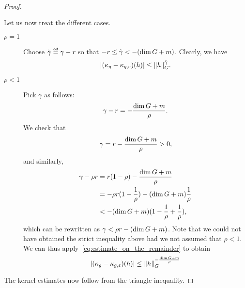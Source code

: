 \begin{proof}
\begin{description}
            Let us now treat the different cases.
            \begin{description}
                \item[$\rho = 1$]
                    Choose $\tilde \gamma \defeq \gamma - r$
                    so that $-r \leq \tilde \gamma < -(\dim \Group + m)$.
                    Clearly, we have
                    \begin{align*}
                        \abs{(\kappa_g - \kappa_{g, \epsilon})(h)}
                        \leq \norm [\Group] h^{\tilde \gamma}.
                    \end{align*}
                \item[$\rho < 1$]
                    Pick $\gamma$ as follows:
                    \begin{align*}
                        \gamma - r = -\frac{\dim \Group + m} \rho.
                    \end{align*}
                    We check that
                    \begin{align*}
                        \gamma = r - \frac {\dim \Group + m} \rho > 0,
                    \end{align*}
                    and similarly,
                    \begin{align*}
                        \gamma - \rho r &= r(1 - \rho) - \frac {\dim \Group + m} \rho\\
                        &= -\rho r(1 - \frac 1 \rho) - (\dim \Group + m) \frac 1 \rho\\
                        &< -(\dim \Group + m)(1 - \frac 1 \rho + \frac 1 \rho),
                    \end{align*}
                    which can be rewritten as $\gamma < \rho r - (\dim \Group + m)$.
                    Note that we could not have obtained the strict inequality above
                    had we not assumed that $\rho < 1$.
                    We can thus apply~\eqref{eq:estimate_on_the_remainder} to obtain
                    \begin{align*}
                        \abs{(\kappa_g - \kappa_{g, \epsilon})(h)}
                        \leq \norm [\Group] h^{-\frac {\dim \Group + m} \rho}
                    \end{align*}
            \end{description}
    \end{description}
    The kernel estimates now follow from the triangle inequality.
\end{proof}

